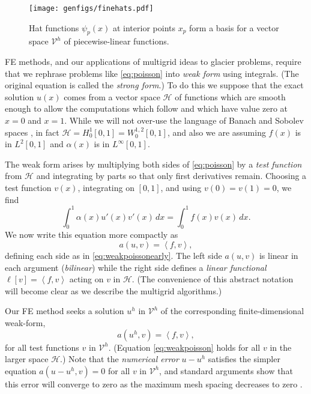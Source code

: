 \documentclass[letterpaper,final,12pt,reqno]{amsart}
\theoremstyle{claim}
\newcommand{\ip}[2]{\left<#1,#2\right>}
\numberwithin{equation}{section}
\numberwithin{figure}{section}
\numberwithin{table}{section}
\begin{document}
\begin{figure}
\texttt{[image: genfigs/finehats.pdf]}
\caption{Hat functions $\psi_p(x)$ at interior points $x_p$ form a basis for a vector space $\mathcal{V}^h$ of piecewise-linear functions.}
\label{fig:finehats}
\end{figure}

FE methods, and our applications of multigrid ideas to glacier problems, require that we rephrase problems like \eqref{eq:poisson} into \emph{weak form} using integrals.  (The original equation is called the \emph{strong form}.)  To do this we suppose that the exact solution $u(x)$ comes from a vector space $\mathcal{H}$ of functions which are smooth enough to allow the computations which follow and which have value zero at $x=0$ and $x=1$.  While we will not over-use the language of Banach and Sobolev spaces \cite[for example]{Evans2010}, in fact $\mathcal{H}=H_0^1[0,1]=W_0^{1,2}[0,1]$, and also we are assuming $f(x)$ is in $L^2[0,1]$ and $\alpha(x)$ is in $L^\infty[0,1]$.

The weak form arises by multiplying both sides of \eqref{eq:poisson} by a \emph{test function} from $\mathcal{H}$ and integrating by parts so that only first derivatives remain.  Choosing a test function $v(x)$, integrating on $[0,1]$, and using $v(0)=v(1)=0$, we find
\begin{equation}
\int_0^1 \alpha(x) u'(x) v'(x)\,dx = \int_0^1 f(x) v(x)\, dx.  \label{eq:weakpoissonearly}
\end{equation}
We now write this equation more compactly as
\begin{equation}
  a(u,v) = \ip{f}{v}, \label{eq:weakpoisson}
\end{equation}
defining each side as in \eqref{eq:weakpoissonearly}.  The left side $a(u,v)$ is linear in each argument (\emph{bilinear}) while the right side defines a \emph{linear functional} $\ell[v] = \ip{f}{v}$ acting on $v$ in $\mathcal{H}$.  (The convenience of this abstract notation will become clear as we describe the multigrid algorithms.)

Our FE method seeks a solution $u^h$ in $\mathcal{V}^h$ of the corresponding finite-dimensional weak-form,
\begin{equation}
  a(u^h,v) = \ip{f}{v},  \label{eq:feweakpoisson}
\end{equation}
for all test functions $v$ in $\mathcal{V}^h$.  (Equation \eqref{eq:weakpoisson} holds for all $v$ in the larger space $\mathcal{H}$.)  Note that the \emph{numerical error} $u-u^h$ satisfies the simpler equation $a(u-u^h,v)=0$ for all $v$ in $\mathcal{V}^h$, and standard arguments show that this error will converge to zero as the maximum mesh spacing decreases to zero \cite{Elmanetal2014}.
\end{document}
